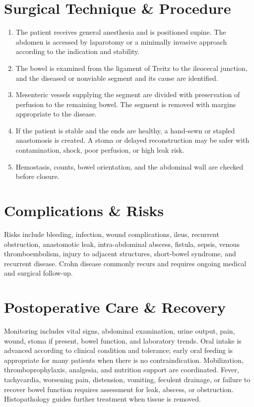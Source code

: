 \section*{Surgical Technique \& Procedure}
\begin{enumerate}
  \item The patient receives general anesthesia and is positioned supine. The abdomen is accessed by laparotomy or a minimally invasive approach according to the indication and stability.
  \item The bowel is examined from the ligament of Treitz to the ileocecal junction, and the diseased or nonviable segment and its cause are identified.
  \item Mesenteric vessels supplying the segment are divided with preservation of perfusion to the remaining bowel. The segment is removed with margins appropriate to the disease.
  \item If the patient is stable and the ends are healthy, a hand-sewn or stapled anastomosis is created. A stoma or delayed reconstruction may be safer with contamination, shock, poor perfusion, or high leak risk.
  \item Hemostasis, counts, bowel orientation, and the abdominal wall are checked before closure.
\end{enumerate}

\section*{Complications \& Risks}
Risks include bleeding, infection, wound complications, ileus, recurrent obstruction, anastomotic leak, intra-abdominal abscess, fistula, sepsis, venous thromboembolism, injury to adjacent structures, short-bowel syndrome, and recurrent disease. Crohn disease commonly recurs and requires ongoing medical and surgical follow-up.

\section*{Postoperative Care \& Recovery}
Monitoring includes vital signs, abdominal examination, urine output, pain, wound, stoma if present, bowel function, and laboratory trends. Oral intake is advanced according to clinical condition and tolerance; early oral feeding is appropriate for many patients when there is no contraindication. Mobilization, thromboprophylaxis, analgesia, and nutrition support are coordinated. Fever, tachycardia, worsening pain, distension, vomiting, feculent drainage, or failure to recover bowel function requires assessment for leak, abscess, or obstruction. Histopathology guides further treatment when tissue is removed.

